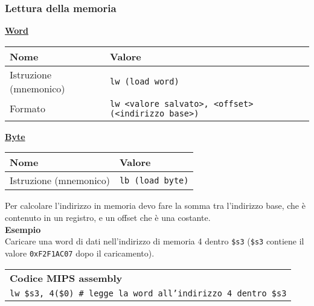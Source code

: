 \documentclass[../main.tex]{subfiles}
\begin{document}
\subsubsection*{Lettura della memoria}
\underline{\textbf{Word}}
\begin{table}[htb!]
    \centering
    \begin{tabular}{ p{4.5cm} | p{10.5cm} }
        Nome & Valore \\
        \hline
        Istruzione (mnemonico) & \texttt{lw (load word)} \\
        Formato & \texttt{lw <valore salvato>, <offset>(<indirizzo base>)}
    \end{tabular}
\end{table}
\newline
\underline{\textbf{Byte}}
\begin{table}[htb!]
    \centering
    \begin{tabular}{ p{4.5cm} | p{10.5cm} }
        Nome & Valore \\
        \hline
        Istruzione (mnemonico) & \texttt{lb (load byte)} \\
    \end{tabular}
\end{table}
\newline
Per calcolare l'indirizzo in memoria devo fare la somma tra
l'indirizzo base, che è contenuto in un registro, e un offset
che è una costante.
\\[3mm]
\textbf{Esempio} \\
Caricare una word di dati nell'indirizzo di
memoria 4 dentro \texttt{\$s3} (\texttt{\$s3}
contiene il valore \texttt{0xF2F1AC07} dopo
il caricamento).
\\[3mm]
\begin{tabular}{ l }
    \textbf{Codice MIPS assembly} \\
    \texttt{lw \$s3, 4(\$0) \hspace*{2mm} \# legge la word all'indirizzo 4 dentro \$s3}
\end{tabular}
\\[3mm]
\end{document}
